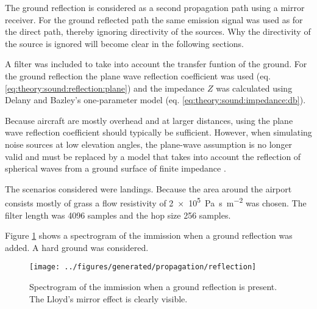 The ground reflection is considered as a second propagation path using a mirror receiver.
For the ground reflected path the same emission signal was used as for the
direct path, thereby ignoring directivity of the sources. Why the directivity of
the source is ignored will become clear in the following sections.

A filter was included to take into account the transfer funtion of the ground.
For the ground reflection the plane wave reflection coefficient was used (eq. \ref{eq:theory:sound:reflection:plane}) and the impedance $Z$ was
calculated using Delany and Bazley's one-parameter model (eq.
\ref{eq:theory:sound:impedance:db}).

Because aircraft are mostly overhead and at larger distances,
using the plane wave reflection coefficient should typically be sufficient.
However, when simulating noise sources at low elevation angles, the plane-wave
assumption is no longer valid and must be replaced by a model that takes into
account the reflection of spherical waves from a ground surface of finite
impedance \cite{Tuttle2014}.

The scenarios considered were landings. Because the area around the airport
consists mostly of grass a flow resistivity of
\SI{2e5}{\pascal\second\per\meter\squared} was chosen. The filter length was
4096 samples and the hop size 256 samples.

Figure \ref{fig:implementation:propagation:reflection} shows a spectrogram of
the immission when a ground reflection was added. A hard ground was considered.

\begin{figure}[H]
  \centering
  \texttt{[image: ../figures/generated/propagation/reflection]}
  \caption{Spectrogram of the immission when a ground reflection is present. The Lloyd's mirror effect is clearly visible.}
  \label{fig:implementation:propagation:reflection}
\end{figure}


